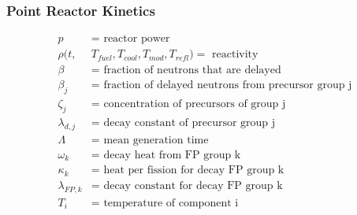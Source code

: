 \begin{frame}
        \frametitle{Point Reactor Kinetics}
        \begin{align}
    p &= \mbox{ reactor power }\\
    \rho(t,&T_{fuel},T_{cool},T_{mod}, T_{refl}) = \mbox{ reactivity}\\
    \beta &= \mbox{ fraction of neutrons that are delayed}\\
    \beta_j &= \mbox{ fraction of delayed neutrons from precursor group j}\\
    \zeta_j &= \mbox{ concentration of precursors of group j}\\
    \lambda_{d,j} &= \mbox{ decay constant of precursor group j}\\
    \Lambda &= \mbox{ mean generation time }\\
    \omega_k &= \mbox{ decay heat from FP group k}\\
    \kappa_k &= \mbox{ heat per fission for decay FP group k}\\
    \lambda_{FP,k} &= \mbox{ decay constant for decay FP group k}\\
    T_i &= \mbox{ temperature of component i}
\end{align}

\end{frame}

